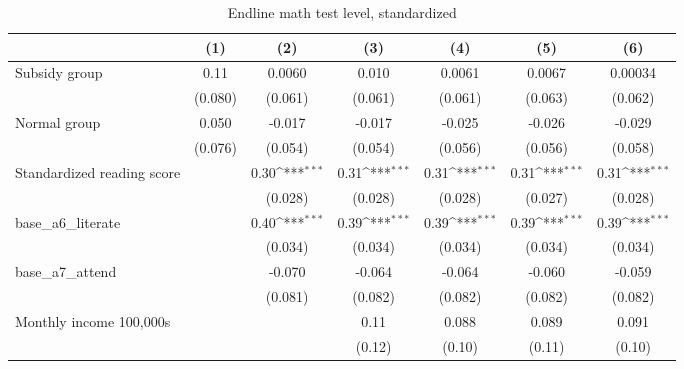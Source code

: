 \begin{table}[htbp]\centering
\def\sym#1{\ifmmode^{#1}\else\(^{#1}\)\fi}
\caption{Endline math test level, standardized}
\begin{tabular*}{1\hsize}{@{\hskip\tabcolsep\extracolsep\fill}l*{6}{c}}
\toprule
                &\multicolumn{1}{c}{(1)}         &\multicolumn{1}{c}{(2)}         &\multicolumn{1}{c}{(3)}         &\multicolumn{1}{c}{(4)}         &\multicolumn{1}{c}{(5)}         &\multicolumn{1}{c}{(6)}         \\
\midrule
Subsidy group   &     0.11         &   0.0060         &    0.010         &   0.0061         &   0.0067         &  0.00034         \\
                &  (0.080)         &  (0.061)         &  (0.061)         &  (0.061)         &  (0.063)         &  (0.062)         \\
Normal group    &    0.050         &   -0.017         &   -0.017         &   -0.025         &   -0.026         &   -0.029         \\
                &  (0.076)         &  (0.054)         &  (0.054)         &  (0.056)         &  (0.056)         &  (0.058)         \\
Standardized reading score&                  &     0.30\sym{***}&     0.31\sym{***}&     0.31\sym{***}&     0.31\sym{***}&     0.31\sym{***}\\
                &                  &  (0.028)         &  (0.028)         &  (0.028)         &  (0.027)         &  (0.028)         \\
base\_a6\_literate&                  &     0.40\sym{***}&     0.39\sym{***}&     0.39\sym{***}&     0.39\sym{***}&     0.39\sym{***}\\
                &                  &  (0.034)         &  (0.034)         &  (0.034)         &  (0.034)         &  (0.034)         \\
base\_a7\_attend  &                  &   -0.070         &   -0.064         &   -0.064         &   -0.060         &   -0.059         \\
                &                  &  (0.081)         &  (0.082)         &  (0.082)         &  (0.082)         &  (0.082)         \\
Monthly income 100,000s&                  &                  &     0.11         &    0.088         &    0.089         &    0.091         \\
                &                  &                  &   (0.12)         &   (0.10)         &   (0.11)         &   (0.10)         \\

\end{tabular*}
\end{table}
